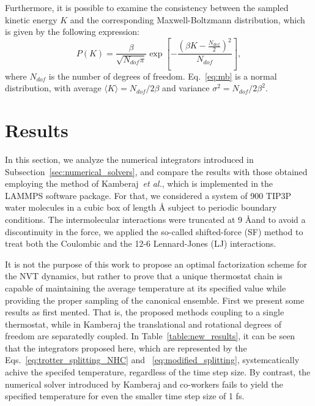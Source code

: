 \documentclass[aip,jcp,reprint,amsmath,amssymb]{revtex4-1}
\begin{document}
Furthermore,  it is possible to examine the consistency between the sampled kinetic energy $K$ and the corresponding Maxwell-Boltzmann distribution, which is given by the following expression:
\begin{equation}
\label{eq:mb}
P(K) = \frac{\beta}{\sqrt{N_{dof}\pi}} \exp\left[-\frac{\left(\beta K - \frac{N_{dof}}{2}\right)^2}{N_{dof}} \right],
\end{equation}
where $N_{dof}$ is the number of degrees of freedom. Eq.~\eqref{eq:mb} is a normal distribution, with average  $ \langle K \rangle = N_{dof}/2\beta $ and variance $\sigma^2 = N_{dof}/2\beta^2$.

\section{Results}
\label{sec:numerical_results}


In this section, we analyze the numerical integrators introduced in Subsection~\ref{sec:numerical_solvers}, and compare the results with those obtained employing the method of Kamberaj~\textit{et al.}\cite{Kamberaj2005}, which is implemented in the LAMMPS\cite{Plimpton1995} software package. For that, we considered a system of 900 TIP3P\cite{Jorgensen_1983} water molecules in a cubic box of length {\AA} subject to periodic boundary conditions. The intermolecular interactions were truncated at 9 \AA and to avoid a discontinuity in the force, we applied the so-called shifted-force (SF) method\cite{Allen1989, Fennell2006, Toxvaerd_2011} to treat both the Coulombic and the 12-6 Lennard-Jones (LJ) interactions.

It is not the purpose of this work to propose an optimal factorization scheme for the NVT dynamics, but rather to prove that a unique thermostat chain is capable of maintaining the average temperature at its specified value while providing the proper sampling of the canonical ensemble. First we present some results as first mented. That is, the proposed methods coupling to a single thermostat, while in Kamberaj the translational and rotational degrees of freedom are separatedly coupled. In Table~\ref{table:new_results}, it can be seen that the integrators proposed here, which are represented by the Eqs.~\eqref{eq:trotter_splitting_NHC} and ~\eqref{eq:modified_splitting}, systemcatically achive the specifed temperature, regardless of the time step size. By contrast, the numerical solver introduced by Kamberaj and co-workers\cite{Kamberaj2005} fails to yield the specified temperature for even the smaller time step size of 1 fs.
\end{document}
